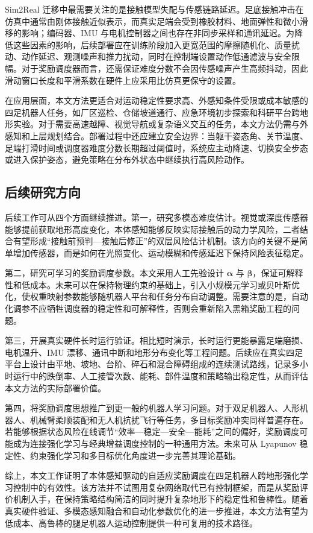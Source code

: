 \documentclass[12pt,a4paper]{ctexart}
\numberwithin{equation}{section}
\numberwithin{table}{section}
\numberwithin{figure}{section}
\begin{document}
Sim2Real 迁移中最需要关注的是接触模型失配与传感链路延迟。足底接触冲击在仿真中通常由刚体接触近似表示，而真实足端会受到橡胶材料、地面弹性和微小滑移的影响；编码器、IMU 与电机控制器之间也存在非同步采样和通讯延迟。为降低这些因素的影响，后续部署应在训练阶段加入更宽范围的摩擦随机化、质量扰动、动作延迟、观测噪声和推力扰动，同时在控制端设置动作低通滤波与安全限幅。对于奖励调度器而言，还需保证难度分数不会因传感噪声产生高频抖动，因此滑动窗口长度和平滑系数在硬件上应采用比仿真更保守的设置。

在应用层面，本文方法更适合对运动稳定性要求高、外感知条件受限或成本敏感的四足机器人任务，如厂区巡检、仓储坡道通行、应急环境初步探索和科研平台跨地形实验。对于需要高速越障、视觉导航或复杂语义交互的任务，本文方法仍需与外感知和上层规划结合。部署过程中还应建立安全边界：当躯干姿态角、关节温度、足端打滑时间或调度器难度分数长期超过阈值时，系统应主动降速、切换安全步态或进入保护姿态，避免策略在分布外状态中继续执行高风险动作。

\subsection{后续研究方向}
后续工作可从四个方面继续推进。第一，研究多模态难度估计。视觉或深度传感器能够提前获取地形高度变化，本体感知能够反映实际接触后的动力学风险，二者结合有望形成“接触前预判—接触后修正”的双层风险估计机制。该方向的关键不是简单增加传感器，而是如何在光照变化、运动模糊和传感延迟下保持风险表征稳定。

第二，研究可学习的奖励调度参数。本文采用人工先验设计 $\bm{\alpha}$ 与 $\bm{\beta}$，保证可解释性和低成本。未来可以在保持物理约束的基础上，引入小规模元学习或贝叶斯优化，使权重映射参数能够随机器人平台和任务分布自动调整。需要注意的是，自动化调参不应牺牲调度器的稳定性和可解释性，否则会重新陷入黑箱奖励工程的问题。

第三，开展真实硬件长时运行验证。相比短时演示，长时运行更能暴露足端磨损、电机温升、IMU 漂移、通讯中断和地形分布变化等工程问题。后续应在真实四足平台上设计由平地、坡地、台阶、碎石和混合障碍组成的连续测试路线，记录多小时运行中的跌倒率、人工接管次数、能耗、部件温度和策略输出稳定性，从而评估本文方法的实际部署价值。

第四，将奖励调度思想推广到更一般的机器人学习问题。对于双足机器人、人形机器人、机械臂柔顺装配和无人机抗扰飞行等任务，多目标奖励冲突同样普遍存在。若能够根据状态风险在线调节“效率—稳定—安全—能耗”之间的偏好，奖励调度可能成为连接强化学习与经典增益调度控制的一种通用方法。未来可从 Lyapunov 稳定性、约束强化学习和多目标优化角度进一步完善其理论基础。

综上，本文工作证明了本体感知驱动的自适应奖励调度在四足机器人跨地形强化学习控制中的有效性。该方法并不试图用复杂网络取代已有控制框架，而是从奖励评价机制入手，在保持策略结构简洁的同时提升复杂地形下的稳定性和鲁棒性。随着真实硬件验证、多模态感知融合和自动化参数优化的进一步推进，本文方法有望为低成本、高鲁棒的腿足机器人运动控制提供一种可复用的技术路径。
\end{document}
